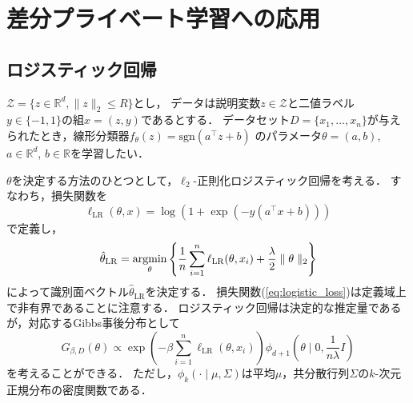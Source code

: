 \documentclass{jarticle}
\newcommand{\argmin}{\operatornamewithlimits{argmin}}
\theoremstyle{definition}
\begin{document}

\section{差分プライベート学習への応用}

\subsection{ロジスティック回帰}

$\mathcal{Z} = \{ z \in \mathbb{R}^d, \parallel z \parallel_2 \leq R \}$とし，
データは説明変数$z \in \mathcal{Z}$と二値ラベル$y \in \{-1, 1\}$の組$x = (z,y)$であるとする．
データセット$D=\{x_1, \ldots, x_n \}$が与えられたとき，線形分類器$f_{\theta}(z) = \mathrm{sgn}(a^\top z + b)$
のパラメータ$\theta = (a,b)$, $a \in \mathbb{R}^d$, $b \in \mathbb{R}$を学習したい．

$\theta$を決定する方法のひとつとして，$\ell_2$-正則化ロジスティック回帰を考える．
すなわち，損失関数を
\begin{equation}
\ell_{\mathrm{LR}}(\theta, x) = \log(1 + \exp(-y (a^\top x + b)))
\label{eq:logistic_loss}
\end{equation}
で定義し，
\begin{equation}
\hat{\theta}_{\mathrm{LR}} =
\argmin_\theta \left \{
\frac{1}{n}\sum_{i=1}^{n}\ell_{\mathrm{LR}}(\theta, x_i) + \frac{\lambda}{2}\parallel \theta \parallel_2
\right \}
\end{equation}
によって識別面ベクトル$\hat{\theta}_{\mathrm{LR}}$を決定する．
損失関数(\ref{eq:logistic_loss})は定義域上で非有界であることに注意する．
ロジスティック回帰は決定的な推定量であるが，対応するGibbs事後分布として
\begin{equation}
G_{\beta, D}(\theta) \propto \exp \left(
-\beta \sum_{i=1}^{n}\ell_{\mathrm{LR}}(\theta, x_i)
\right)\phi_{d+1}(\theta \mid 0, \frac{1}{n\lambda} I)
\label{eq:logistic_gibbs}
\end{equation}
を考えることができる．
ただし，$\phi_k(\cdot \mid \mu, \Sigma)$は平均$\mu$，共分散行列$\Sigma$の$k$-次元正規分布の密度関数である．
\end{document}
